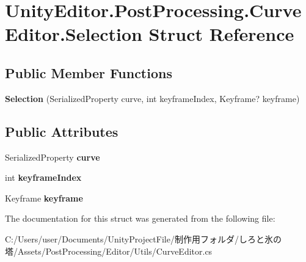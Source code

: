 \hypertarget{struct_unity_editor_1_1_post_processing_1_1_curve_editor_1_1_selection}{}\section{Unity\+Editor.\+Post\+Processing.\+Curve\+Editor.\+Selection Struct Reference}
\label{struct_unity_editor_1_1_post_processing_1_1_curve_editor_1_1_selection}
\subsection*{Public Member Functions}
\begin{DoxyCompactItemize}
\item 
\mbox{\label{struct_unity_editor_1_1_post_processing_1_1_curve_editor_1_1_selection_aec7d22cb022a0018f74986c6e7dee9dd}} 
{\bfseries Selection} (Serialized\+Property curve, int keyframe\+Index, Keyframe? keyframe)
\end{DoxyCompactItemize}
\subsection*{Public Attributes}
\begin{DoxyCompactItemize}
\item 
\mbox{\label{struct_unity_editor_1_1_post_processing_1_1_curve_editor_1_1_selection_a1e1a968fd45439d25970a792a4b6507c}} 
Serialized\+Property {\bfseries curve}
\item 
\mbox{\label{struct_unity_editor_1_1_post_processing_1_1_curve_editor_1_1_selection_aa592863c4ef55aa09ca57ac7b5b9fbe5}} 
int {\bfseries keyframe\+Index}
\item 
\mbox{\label{struct_unity_editor_1_1_post_processing_1_1_curve_editor_1_1_selection_a15a30ec45b9899c209e56e18b6f19a1f}} 
Keyframe {\bfseries keyframe}
\end{DoxyCompactItemize}


The documentation for this struct was generated from the following file\+:\begin{DoxyCompactItemize}
\item 
C\+:/\+Users/user/\+Documents/\+Unity\+Project\+File/制作用フォルダ/しろと氷の塔/\+Assets/\+Post\+Processing/\+Editor/\+Utils/Curve\+Editor.\+cs\end{DoxyCompactItemize}
